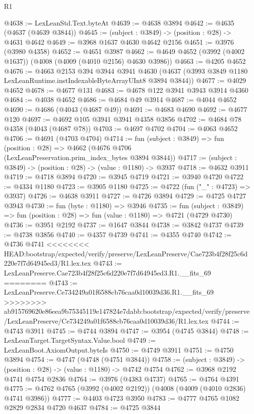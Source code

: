\begin{lexlean}{R1}
\begin{coremodule}
{{{{{{{{{{{{{{{{{{{{{{{{{{{{{{{{{{{{{{{{{{{{{{{{{{{{{{{{{{{{{{{{{{{{{{{{{{{{{{{{{{{{{{{{{{{{{{{{{{{{{{{{{{{{{{{{{{{{{{{{{{{{{{{{{{{{{{{{{{{{{{{{{{{{{{{{{{{{{{{{{{{{{{{{{{{{{{{{{{{{{{{{{{@4638 := LexLeanStd.Text.byteAt
@4639 := @4638 @3894
@4642 := @4635 (@4637 (@4639 @3844))
@4645 := (subject : @3849) -> (position : @28) -> @4631 @4642
@4649 := @3968 @1637 @4630 @4642 @2156
@4651 := @3976 (@3980 @4358)
@4652 := @4651 @3987
@4662 := @4649 @4652 (@3992 (@4002 @1637)) (@4008 (@4009 (@4010 @2156) @4630 @3986))
@4663 := @4205 @4652
@4676 := @4663
    @2153
    @394
    @3944
    @3941
    @4630
    (@4637 (@3993 @3849 @1180 LexLeanRuntime.instIndexableByteArrayUInt8 @3894 @3844))
@4677 := @4029 @4652
@4678 := @4677 @131
@4683 := @4678 @122 @3941 @3943 @3914 @4360
@4684 := @4038 @4652
@4686 := @4684 @49 @3914
@4687 := @4044 @4652
@4690 := @4686 (@4043 (@4687 @49))
@4691 := @4683 @4690
@4692 := @4677 @120
@4697 := @4692 @105 @3941 @3941 @4358 @3856
@4702 := @4684 @78 @4358 (@4043 (@4687 @78))
@4703 := @4697 @4702
@4704 := @4063 @4652
@4706 := @4691 (@4703 @4704)
@4714 := fun (subject : @3849) =>
  fun (position : @28) => @4662 (@4676 @4706 (LexLeanPreservation.prim_index_bytes @3894 @3844))
@4717 := (subject : @3849) -> (position : @28) -> (value : @1180) -> @3937
@4718 := @4632 @3911
@4719 := @4718 @3894
@4720 := @3945 @4719
@4721 := @3940 @4720
@4722 := @4334 @1180
@4723 := @3905 @1180
@4725 := @4722 (fun ("_" : @4723) => @3937)
@4726 := @4638 @3911
@4727 := @4726 @3894
@4729 := @4725 @4727 @3943
@4730 := fun (byte : @1180) => @3946
@4735 := fun (subject : @3849) => fun (position : @28) => fun (value : @1180) => @4721 (@4729 @4730)
@4736 := @3951 @2192
@4737 := @1647 @3844
@4738 := @3842 @4737
@4739 := @4738 @3856
@4740 := @4357 @4739
@4741 := @4355 @4740
@4742 := @4736 @4741
<<<<<<<< HEAD:bootstrap/expected/verify/preserve/LexLeanPreserve/Cae723b4f28f25c6d220e7f7d64945ed3/R1.lex.tex
@4743 := LexLeanPreserve.Cae723b4f28f25c6d220e7f7d64945ed3.R1.__fits_69
========
@4743 := LexLeanPreserve.Ce734249a01f6588cb76caa0d10039d36.R1.__fits_69
>>>>>>>> ab915769620e86eea9b75345119e147824e7dabb:bootstrap/expected/verify/preserve/LexLeanPreserve/Ce734249a01f6588cb76caa0d10039d36/R1.lex.tex
@4744 := @4743 @3911
@4745 := @4744 @3894
@4747 := @3954 (@4745 @3844)
@4748 := LexLeanTarget.TargetSyntax.Value.bool
@4749 := LexLeanBoot.AxiomOutput.byteIs
@4750 := @4749 @3911
@4751 := @4750 @3894
@4754 := @4747 (@4748 (@4751 @3844))
@4758 := (subject : @3849) -> (position : @28) -> (value : @1180) -> @4742 @4754
@4762 := @3968 @2192 @4741 @4754 @2836
@4764 := @3976 (@4383 @4737)
@4765 := @4764 @4391
@4775 := @4762 @4765 (@3992 (@4002 @2192)) (@4008 (@4009 (@4010 @2836) @4741 @3986))
@4777 := @4403 @4723 @3950
@4783 := @4777 @4765 @1082 @2829 @2834 @4720 @4637
@4784 := @4725 @3844
}}}}}}}}}}}}}}}}}}}}}}}}}}}}}}}}}}}}}}}}}}}}}}}}}}}}}}}}}}}}}}}}}}}}}}}}}}}}}}}}}}}}}}}}}}}}}}}}}}}}}}}}}}}}}}}}}}}}}}}}}}}}}}}}}}}}}}}}}}}}}}}}}}}}}}}}}}}}}}}}}}}}}}}}}}}}}}}}}}}}}}}}}}
\end{coremodule}
\end{lexlean}
